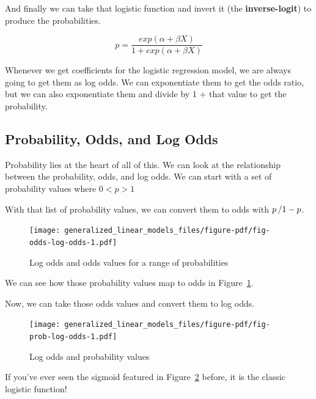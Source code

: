 \documentclass[
  letterpaper,
]{krantz}
\begin{document}
And finally we can take that logistic function and invert it (the
\textbf{inverse-logit}) to produce the probabilities.

\[p = \frac{exp(\alpha + \beta X)}{1 + exp(\alpha + \beta X)}\]

Whenever we get coefficients for the logistic regression model, we are
always going to get them as log odds. We can exponentiate them to get
the odds ratio, but we can also exponentiate them and divide by 1 + that
value to get the probability.

\subsection{Probability, Odds, and Log
Odds}\label{probability-odds-and-log-odds}

Probability lies at the heart of all of this. We can look at the
relationship between the probability, odds, and log odds. We can start
with a set of probability values where \(0 < p > 1\)

With that list of probability values, we can convert them to odds with
\(\\p\, / 1 - p\).

\begin{figure}

{\centering \texttt{[image: generalized\_linear\_models\_files/figure-pdf/fig-odds-log-odds-1.pdf]}

}

\caption{\label{fig-odds-log-odds}Log odds and odds values for a range
of probabilities}

\end{figure}

We can see how those probability values map to odds in
Figure~\ref{fig-odds-log-odds}.

Now, we can take those odds values and convert them to log odds.

\begin{figure}

{\centering \texttt{[image: generalized\_linear\_models\_files/figure-pdf/fig-prob-log-odds-1.pdf]}

}

\caption{\label{fig-prob-log-odds}Log odds and probability values}

\end{figure}

If you've ever seen the sigmoid featured in
Figure~\ref{fig-prob-log-odds} before, it is the classic logistic
function!
\end{document}
